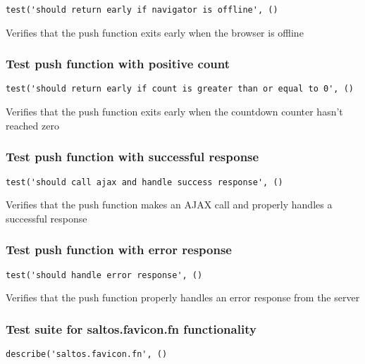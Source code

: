 \documentclass[a4paper]{article}
\begin{document}
\begin{lstlisting}
test('should return early if navigator is offline', ()
\end{lstlisting}

Verifies that the push function exits early when the browser
is offline

\hypertarget{toc249}{}
\subsubsection{Test push function with positive count}

\begin{lstlisting}
test('should return early if count is greater than or equal to 0', ()
\end{lstlisting}

Verifies that the push function exits early when the countdown
counter hasn't reached zero

\hypertarget{toc250}{}
\subsubsection{Test push function with successful response}

\begin{lstlisting}
test('should call ajax and handle success response', ()
\end{lstlisting}

Verifies that the push function makes an AJAX call and properly
handles a successful response

\hypertarget{toc251}{}
\subsubsection{Test push function with error response}

\begin{lstlisting}
test('should handle error response', ()
\end{lstlisting}

Verifies that the push function properly handles an error response
from the server

\hypertarget{toc252}{}
\subsubsection{Test suite for saltos.favicon.fn functionality}

\begin{lstlisting}
describe('saltos.favicon.fn', ()
\end{lstlisting}
\end{document}
